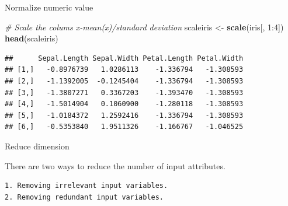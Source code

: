 \documentclass[ignorenonframetext,]{beamer}
\newenvironment{Shaded}{\begin{snugshade}}{\end{snugshade}}
\newcommand{\KeywordTok}[1]{\textcolor[rgb]{0.13,0.29,0.53}{\textbf{{#1}}}}
\newcommand{\DecValTok}[1]{\textcolor[rgb]{0.00,0.00,0.81}{{#1}}}
\newcommand{\StringTok}[1]{\textcolor[rgb]{0.31,0.60,0.02}{{#1}}}
\newcommand{\CommentTok}[1]{\textcolor[rgb]{0.56,0.35,0.01}{\textit{{#1}}}}
\newcommand{\NormalTok}[1]{{#1}}
\begin{document}
\begin{frame}[fragile]{Normalize numeric value}

\begin{Shaded}
\begin{Highlighting}[]
\CommentTok{# Scale the colums x-mean(x)/standard deviation}
\NormalTok{scaleiris <-}\StringTok{ }\KeywordTok{scale}\NormalTok{(iris[, }\DecValTok{1}\NormalTok{:}\DecValTok{4}\NormalTok{])}
\KeywordTok{head}\NormalTok{(scaleiris)}
\end{Highlighting}
\end{Shaded}

\begin{verbatim}
##      Sepal.Length Sepal.Width Petal.Length Petal.Width
## [1,]   -0.8976739   1.0286113    -1.336794   -1.308593
## [2,]   -1.1392005  -0.1245404    -1.336794   -1.308593
## [3,]   -1.3807271   0.3367203    -1.393470   -1.308593
## [4,]   -1.5014904   0.1060900    -1.280118   -1.308593
## [5,]   -1.0184372   1.2592416    -1.336794   -1.308593
## [6,]   -0.5353840   1.9511326    -1.166767   -1.046525
\end{verbatim}

\end{frame}

\begin{frame}[fragile]{Reduce dimension}

There are two ways to reduce the number of input attributes.

\begin{verbatim}
1. Removing irrelevant input variables.
2. Removing redundant input variables.
\end{verbatim}

\end{frame}
\end{document}
